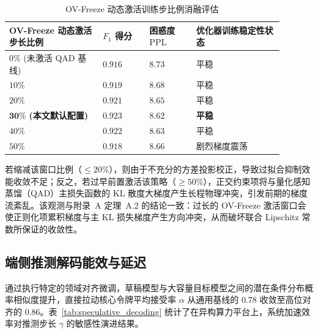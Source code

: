 \documentclass[11pt, a4paper]{article}
\begin{document}
\begin{table}[htbp]
\centering
\caption{OV-Freeze 动态激活训练步比例消融评估}
\label{tab9}
\small
\renewcommand{\arraystretch}{1.15}
\begin{tabular}{>{\raggedright\arraybackslash}p{0.3\linewidth}>{\centering\arraybackslash}p{0.15\linewidth}>{\centering\arraybackslash}p{0.15\linewidth}>{\centering\arraybackslash}p{0.29\linewidth}}
\toprule
\textbf{OV-Freeze 动态激活步长比例} & \textbf{$F_1$ 得分} & \textbf{困惑度 $\mathrm{PPL}$ } & \textbf{优化器训练稳定性状态} \\
\midrule
$0\%$ (未激活 QAD 基线) & $0.916$ & $8.73$ & 平稳 \\
$10\%$ & $0.919$ & $8.68$ & 平稳 \\
$20\%$ & $0.921$ & $8.65$ & 平稳 \\
$\mathbf{30\%}$ \textbf{(本文默认配置)} & $\mathbf{0.923}$ & $\mathbf{8.62}$ & \textbf{平稳} \\
$40\%$ & $0.922$ & $8.63$ & 平稳 \\
$50\%$ & $0.918$ & $8.66$ & 剧烈梯度震荡\\
\bottomrule
\end{tabular}
\end{table}

若缩减该窗口比例（$\le 20\%$），则由于不充分的方差投影校正，导致过拟合抑制效能收敛不足；反之，若过早前置激活该策略（$\ge 50\%$），正交约束项将与量化感知蒸馏（QAD）主损失函数的 KL 散度大梯度产生长程物理冲突，引发前期的梯度流紊乱。该观测与附录~A 定理~A.2 的结论一致：过长的 OV-Freeze 激活窗口会使正则化项累积梯度与主 KL 损失梯度产生方向冲突，从而破坏联合 Lipschitz 常数所保证的收敛性。

\subsection{端侧推测解码能效与延迟}

通过执行特定的领域对齐微调，草稿模型与大容量目标模型之间的潜在条件分布概率相似度提升，直接拉动核心令牌平均接受率 $\alpha$ 从通用基线的 $0.78$ 收敛至高位对齐的 $0.86$。表~\ref{tab:speculative_decoding} 统计了在异构算力平台上，系统加速效率对推测步长 $\gamma$ 的敏感性演进结果。
\end{document}
